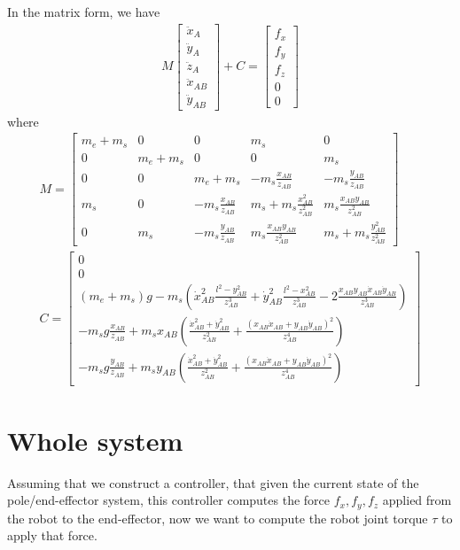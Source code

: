 \documentclass{article}
\begin{document}
In the matrix form, we have
\begin{align}
	M	\begin{bmatrix}\ddot{x}_A\\\ddot{y}_A\\\ddot{z}_A\\\ddot{x}_{AB}\\\ddot{y}_{AB}\end{bmatrix} + C = \begin{bmatrix}f_x\\f_y\\f_z\\0\\0\end{bmatrix}\label{eq:pole_ee_manipulator_eq}
\end{align}
where
\begin{align}
	M = 
	\begin{bmatrix}
		m_e + m_s & 0 & 0 & m_s & 0\\
		0 & m_e + m_s & 0 & 0 & m_s\\
		0 & 0 & m_e + m_s & -m_s\frac{x_{AB}}{z_{AB}} & -m_s\frac{y_{AB}}{z_{AB}}\\
		m_s& 0 & -m_s\frac{x_{AB}}{z_{AB}} & m_s + m_s\frac{x_{AB}^2}{z_{AB}^2} & m_s\frac{x_{AB}y_{AB}}{z_{AB}^2}\\
		0 & m_s & -m_s\frac{y_{AB}}{z_{AB}} &m_s\frac{x_{AB}y_{AB}}{z_{AB}^2} & m_s + m_s\frac{y_{AB}^2}{z_{AB}^2}
	\end{bmatrix}\\
	C = \begin{bmatrix}
		0\\
		0\\
		(m_e + m_s)g - m_s\left(\dot{x}_{AB}^2\frac{l^2-y_{AB}^2}{z_{AB}^3} + \dot{y}_{AB}^2\frac{l^2-x_{AB}^2}{z_{AB}^3} - 2\frac{x_{AB}y_{AB}\dot{x}_{AB}\dot{y}_{AB}}{z_{AB}^3}\right)\\
		-m_sg\frac{x_{AB}}{z_{AB}}+m_sx_{AB}\left(\frac{\dot{x}_{AB}^2 + \dot{y}_{AB}^2}{z_{AB}^2}+\frac{(x_{AB}\dot{x}_{AB} + y_{AB}\dot{y}_{AB})^2}{z_{AB}^4}\right)\\
		-m_sg\frac{y_{AB}}{z_{AB}}+m_sy_{AB}\left(\frac{\dot{x}_{AB}^2 + \dot{y}_{AB}^2}{z_{AB}^2}+\frac{(x_{AB}\dot{x}_{AB} + y_{AB}\dot{y}_{AB})^2}{z_{AB}^4}\right)
	\end{bmatrix}
\end{align}

\section{Whole system}
Assuming that we construct a controller, that given the current state of the pole/end-effector system, this controller computes the force $f_x, f_y, f_z$ applied from the robot to the end-effector, now we want to compute the robot joint torque $\tau$ to apply that force.
\end{document}
